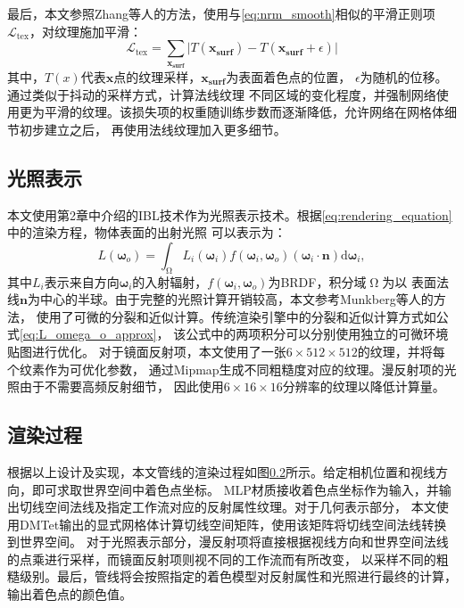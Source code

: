 最后，本文参照Zhang等人\cite{zhang2021nerfactor}的方法，使用与\ref{eq:nrm_smooth}相似的平滑正则项$\mathcal{L}_\text{tex}$，对纹理施加平滑：
\begin{equation}
  \label{eq:tex_smooth}
  \mathcal{L}_{\text{tex}} = \sum_{\boldsymbol{x_\text{surf}}} {\lvert {T({\boldsymbol{x_\text{surf}}})} - {T({\boldsymbol{x_\text{surf}}}+\epsilon)}\rvert}
\end{equation}
其中，$T(x)$代表$\boldsymbol{x}$点的纹理采样，$\boldsymbol{x_\text{surf}}$为表面着色点的位置，
$\epsilon$为随机的位移。通过类似于抖动的采样方式，计算法线纹理
不同区域的变化程度，并强制网络使用更为平滑的纹理。该损失项的权重随训练步数而逐渐降低，允许网络在网格体细节初步建立之后，
再使用法线纹理加入更多细节。

\subsection{光照表示}
本文使用第2章中介绍的IBL技术作为光照表示技术。根据\eqref{eq:rendering_equation}中的渲染方程，物体表面的出射光照
可以表示为：
\begin{equation}
  \label{eq:radiance}
  L\left({\boldsymbol{\omega}}_o\right)=\int_{\upOmega} L_i\left({\boldsymbol{\omega}}_i\right)f\left({\boldsymbol{\omega}}_i,{\boldsymbol{\omega}}_o\right)\left({\boldsymbol{\omega}}_i\cdot\boldsymbol{n}\right)\mathrm{d}{\boldsymbol{\omega}}_i,
\end{equation}
其中$L_i$表示来自方向${\boldsymbol{\omega}}_i$的入射辐射，$f\left({\boldsymbol{\omega}}_i,{\boldsymbol{\omega}}_o\right)$为BRDF，积分域$\upOmega$为以
表面法线$\boldsymbol{n}$为中心的半球。由于完整的光照计算开销较高，本文参考Munkberg等人\cite{Munkberg_2022}的方法，
使用了可微的分裂和近似计算。传统渲染引擎中的分裂和近似计算方式如公式\ref{eq:L_omega_o_approx}，
该公式中的两项积分可以分别使用独立的可微环境贴图进行优化。
对于镜面反射项，本文使用了一张$6\times512\times512$的纹理，并将每个纹素作为可优化参数，
通过Mipmap生成不同粗糙度对应的纹理。漫反射项的光照由于不需要高频反射细节，
因此使用$6\times16\times16$分辨率的纹理以降低计算量。

\subsection{渲染过程}
根据以上设计及实现，本文管线的渲染过程如图\ref{}所示。给定相机位置和视线方向，即可求取世界空间中着色点坐标。
MLP材质接收着色点坐标作为输入，并输出切线空间法线及指定工作流对应的反射属性纹理。对于几何表示部分，
本文使用DMTet输出的显式网格体计算切线空间矩阵，使用该矩阵将切线空间法线转换到世界空间。
对于光照表示部分，漫反射项将直接根据视线方向和世界空间法线的点乘进行采样，而镜面反射项则视不同的工作流而有所改变，
以采样不同的粗糙级别。最后，管线将会按照指定的着色模型对反射属性和光照进行最终的计算，输出着色点的颜色值。


